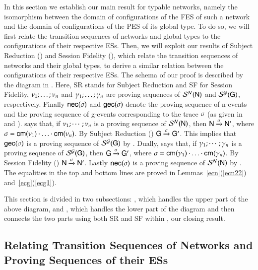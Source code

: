 In this section we establish our main result for typable networks,
namely the isomorphism between the domain of configurations of the FES
of such a network and the domain of configurations of the PES of its
global type.   To do so, we will first relate the transition
sequences of networks and global types to the configurations of their
respective ESs. Then, we will exploit our results of Subject Reduction
() and Session Fidelity (), which
relate the transition sequences of networks and their global types, to
derive a similar relation between the configurations of their
respective ESs. The schema of our proof is described by the 
diagram in . 
Here, SR
stands for Subject Reduction and SF for Session Fidelity,  $\nu_1;\ldots;\nu_n$ and $\gamma_1;\ldots;\gamma_n$ are proving sequences of $\mathcal{S}^{\mathcal{N}}({\sf N})$ and $\mathcal{S}^{\mathcal{G}}({\sf G})$, respectively.
Finally 
${\sf nec}(\sigma)$ and ${\sf gec}(\sigma)$ denote   the proving sequence
of n-events and the proving sequence of g-events corresponding to the trace
$\sigma$ (as given in  and ).  
 says that, if
${\nu_1};\cdots;\nu_n$ is a proving sequence of
$\mathcal{S}^{\mathcal{N}}({\sf N})$, then ${\sf N}\xrightarrow{\sigma}{\sf N}'$, where $\sigma={\sf cm}(\nu_1)\cdot\ldots\cdot{\sf cm}(\nu_n)$. By Subject Reduction ()
${\sf G}\xrightarrow{\sigma}{\sf G}'$. This implies  
that ${\sf gec}(\sigma)$ is a proving
sequence of $\mathcal{S}^{\mathcal{G}}({\sf G})$ by . Dually,   says that, if
${\gamma_1};\cdots;\gamma_n$ is a proving sequence of
$\mathcal{S}^{\mathcal{G}}({\sf G})$, then ${\sf G}\xrightarrow{\sigma}{\sf G}'$, where $\sigma={\sf cm}(\gamma_1)\cdot\ldots\cdot{\sf cm}(\gamma_n)$.  By Session Fidelity ()  ${\sf N}\xrightarrow{\sigma}{\sf N}'$. Lastly ${\sf nec}(\sigma)$ is a proving
sequence of $\mathcal{S}^{\mathcal{N}}({\sf N})$ by . The equalities in the top and bottom lines are proved in Lemmas~\ref{ecn}(\ref{ecn22}) and~\ref{ecg}(\ref{ecg1}). 
 


 This section is divided in two subsections: ,
 which handles the upper part of the above diagram, and
 , which handles the lower part of the diagram and
 then connects the two parts using both SR and SF within
 , our closing result.


\subsection{Relating Transition Sequences of Networks and Proving
  Sequences of their ESs}\label{lozenges}

